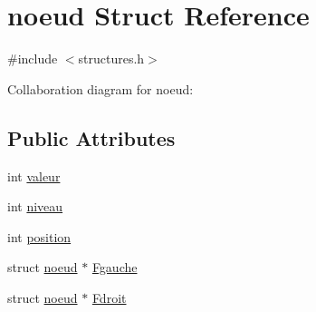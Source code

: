 \hypertarget{structnoeud}{\section{noeud Struct Reference}
\label{structnoeud}
}


{\ttfamily \#include $<$structures.\+h$>$}



Collaboration diagram for noeud\+:
\subsection*{Public Attributes}
\begin{DoxyCompactItemize}
\item 
int \hyperlink{structnoeud_a943c55b643fdf9acd4bc8cda1dcfba06}{valeur}
\item 
int \hyperlink{structnoeud_a8213ec379800aa3c5a0772cd15ac151a}{niveau}
\item 
int \hyperlink{structnoeud_a7fe3ce5cf4c61fce2382be3679cd7029}{position}
\item 
struct \hyperlink{structnoeud}{noeud} $\ast$ \hyperlink{structnoeud_a6a44dcdda3708b7ef2e873e118accd97}{Fgauche}
\item 
struct \hyperlink{structnoeud}{noeud} $\ast$ \hyperlink{structnoeud_a4594b54a400996607318567324142e37}{Fdroit}
\end{DoxyCompactItemize}


